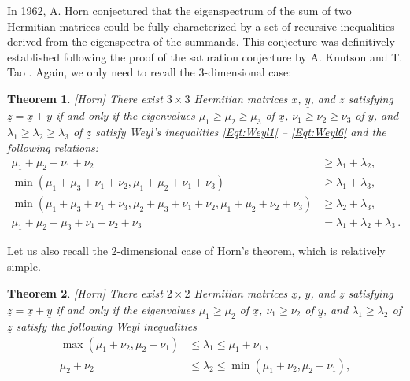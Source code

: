 \documentclass[12pt]{amsart}
\newtheorem{theorem}{Theorem}[section]
\theoremstyle{definition}
\numberwithin{equation}{section}
\begin{document}
{ 
 In 1962, A. Horn conjectured that the eigenspectrum of the sum of two Hermitian matrices could be fully characterized by a set of recursive inequalities derived from the eigenspectra of the summands. This conjecture was definitively established following the proof of the saturation conjecture by A. Knutson and T. Tao \cite{Tao}. Again,   we only need to recall the $3$-dimensional case:
 
\begin{theorem}\label{Thm:3X3Horn}[Horn] 
There exist $3\times 3$ Hermitian matrices 
  $\underline{x}$, $\underline{y}$, and $\underline{z}$ satisfying $\underline{z}=\underline{x}+\underline{y}$  
  if and only if the 
   eigenvalues    $\mu_1\geqslant \mu_2\geqslant \mu_3$ of $\underline{x}$,   $\nu_1\geqslant \nu_2\geqslant \nu_3$ of $\underline{y}$, and $\lambda_1\geqslant \lambda_2\geqslant \lambda_3$ of $\underline{z}$  satisfy    Weyl's inequalities \eqref{Eqt:Weyl1} -- \eqref{Eqt:Weyl6} and the  following relations:
  \begin{align*} 
\mu_1 + \mu_2 + \nu_1 + \nu_2 &\geqslant\lambda_1 + \lambda_2, \\
\min(\mu_1 + \mu_3 + \nu_1 + \nu_2,\mu_1 + \mu_2 + \nu_1 + \nu_3 ) &\geqslant\lambda_1 + \lambda_3, \\ 
\min(\mu_1 + \mu_3 + \nu_1 + \nu_3,\mu_2 + \mu_3 + \nu_1 + \nu_2,\mu_1 + \mu_2 + \nu_2 + \nu_3) &\geqslant\lambda_2 + \lambda_3,  
\\
\mu_1 + \mu_2 + \mu_3 + \nu_1 + \nu_2 + \nu_3 &= \lambda_1 + \lambda_2 + \lambda_3\,.
\end{align*}
     
\end{theorem}

Let us also   recall the $2$-dimensional case of Horn's theorem, which is relatively simple.
 
\begin{theorem}\label{Thm:2X2Horn}[Horn] 
There exist $2\times 2$ Hermitian matrices 
  $\underline{x}$, $\underline{y}$, and $\underline{z}$ satisfying $\underline{z}=\underline{x}+\underline{y}$  
  if and only if the 
   eigenvalues    $\mu_1\geqslant \mu_2 $ of $\underline{x}$,   $\nu_1\geqslant \nu_2 $ of $\underline{y}$, and $\lambda_1\geqslant \lambda_2 $ of $\underline{z}$  satisfy  the following Weyl inequalities   
   \begin{align*} 
\max(\mu_1 + \nu_2,     \mu_2 + \nu_1)   &\leqslant \lambda_1 \leqslant  \mu_1 + \nu_1  \,,\\
\mu_2+\nu_2 &\leqslant \lambda_2 \leqslant \min(\mu_1 + \nu_2,     \mu_2 + \nu_1),
\end{align*}
   

\end{theorem}}
\end{document}
